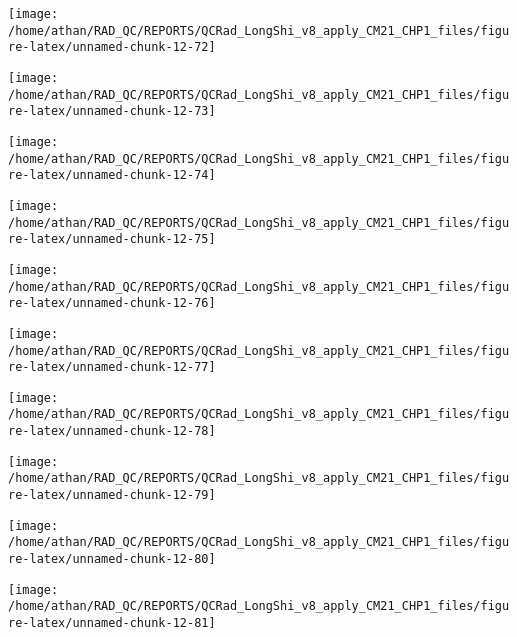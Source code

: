 \documentclass[
  10pt,
  a4paper,oneside]{article}
\begin{document}
\begin{center}\texttt{[image: /home/athan/RAD\_QC/REPORTS/QCRad\_LongShi\_v8\_apply\_CM21\_CHP1\_files/figure-latex/unnamed-chunk-12-72]} \end{center}

\begin{center}\texttt{[image: /home/athan/RAD\_QC/REPORTS/QCRad\_LongShi\_v8\_apply\_CM21\_CHP1\_files/figure-latex/unnamed-chunk-12-73]} \end{center}

\begin{center}\texttt{[image: /home/athan/RAD\_QC/REPORTS/QCRad\_LongShi\_v8\_apply\_CM21\_CHP1\_files/figure-latex/unnamed-chunk-12-74]} \end{center}

\begin{center}\texttt{[image: /home/athan/RAD\_QC/REPORTS/QCRad\_LongShi\_v8\_apply\_CM21\_CHP1\_files/figure-latex/unnamed-chunk-12-75]} \end{center}

\begin{center}\texttt{[image: /home/athan/RAD\_QC/REPORTS/QCRad\_LongShi\_v8\_apply\_CM21\_CHP1\_files/figure-latex/unnamed-chunk-12-76]} \end{center}

\begin{center}\texttt{[image: /home/athan/RAD\_QC/REPORTS/QCRad\_LongShi\_v8\_apply\_CM21\_CHP1\_files/figure-latex/unnamed-chunk-12-77]} \end{center}

\begin{center}\texttt{[image: /home/athan/RAD\_QC/REPORTS/QCRad\_LongShi\_v8\_apply\_CM21\_CHP1\_files/figure-latex/unnamed-chunk-12-78]} \end{center}

\begin{center}\texttt{[image: /home/athan/RAD\_QC/REPORTS/QCRad\_LongShi\_v8\_apply\_CM21\_CHP1\_files/figure-latex/unnamed-chunk-12-79]} \end{center}

\begin{center}\texttt{[image: /home/athan/RAD\_QC/REPORTS/QCRad\_LongShi\_v8\_apply\_CM21\_CHP1\_files/figure-latex/unnamed-chunk-12-80]} \end{center}

\begin{center}\texttt{[image: /home/athan/RAD\_QC/REPORTS/QCRad\_LongShi\_v8\_apply\_CM21\_CHP1\_files/figure-latex/unnamed-chunk-12-81]} \end{center}
\end{document}

